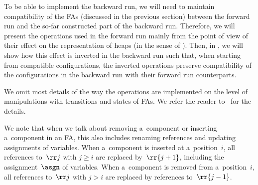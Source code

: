 %
To be able to implement the backward run, we will need to maintain
compatibility of the FAs (discussed in the previous section) between the forward run and
the so-far constructed part of the backward run.
%
Therefore, we will present the operations used in the forward run mainly from
the point of view of their effect on the representation  of heaps (in the sense
of ).
%
Then, in , we will show how this effect is inverted in
the backward run such that, when starting from compatible
configurations, the inverted operations preserve compatibility of the
configurations in the backward run with their forward run counterparts.



%
We omit most details of the way the operations are implemented on the level of
manipulations with transitions and states of FAs. 
We refer the reader to~\cite{habermehl:forest,jiri:diza,martin:dp} for the
details.

We note that when we talk about removing a~component or inserting a~component
in an FA, this also includes renaming references and updating
assignments of variables.
%
When a~component is inserted at a~position~$i$, all references to~$\rr j$ with
$j \geq i$ are replaced by~$\rr{j+1}$, including the assignment~$\asgn$ of variables.
%
When a~component is removed from a~position~$i$, all references to~$\rr j$ with $j > i$ are
replaced by references to~$\rr{j-1}$. 




